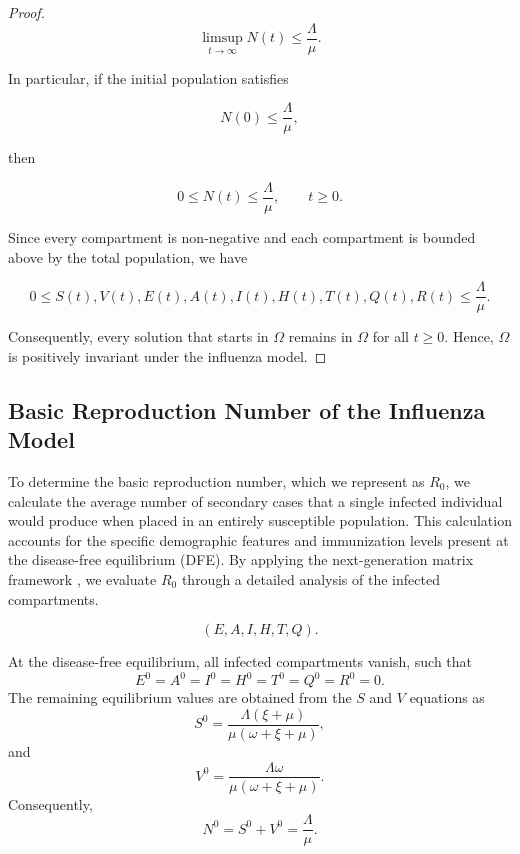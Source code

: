 \documentclass[12pt,a4paper]{article}
\theoremstyle{definition}
\theoremstyle{remark}
\begin{document}
\begin{proof}
\[
\limsup_{t\rightarrow\infty}N(t)
\leq
\frac{\Lambda}{\mu}.
\]

In particular, if the initial population satisfies

\[
N(0)\leq\frac{\Lambda}{\mu},
\]

then

\[
0\leq N(t)\leq\frac{\Lambda}{\mu},
\qquad t\geq0.
\]

Since every compartment is non-negative and each compartment is bounded
above by the total population, we have

\[
0\leq S(t),V(t),E(t),A(t),I(t),H(t),T(t),Q(t),R(t)
\leq\frac{\Lambda}{\mu}.
\]

Consequently, every solution that starts in $\Omega$ remains in $\Omega$
for all $t\geq0$. Hence, $\Omega$ is positively invariant under the
influenza model.

\end{proof}


\subsection{Basic Reproduction Number of the Influenza Model}

To determine the basic reproduction number, which we represent as $R_0$, we calculate the average number of secondary cases that a single infected individual would produce when placed in an entirely susceptible population. This calculation accounts for the specific demographic features and immunization levels present at the disease-free equilibrium (DFE). By applying the next-generation matrix framework \cite{vandenDriessche2002}, we evaluate $R_0$ through a detailed analysis of the infected compartments.


\[
(E,A,I,H,T,Q).
\]

At the disease-free equilibrium, all infected compartments vanish, such that
\[
E^0=A^0=I^0=H^0=T^0=Q^0=R^0=0.
\]
The remaining equilibrium values are obtained from the $S$ and $V$ equations as
\begin{equation}
S^0=
\frac{\Lambda(\xi+\mu)}
{\mu(\omega+\xi+\mu)},
\end{equation}
and
\begin{equation}
V^0=
\frac{\Lambda\omega}
{\mu(\omega+\xi+\mu)}.
\end{equation}
Consequently,
\begin{equation}
N^0=S^0+V^0=\frac{\Lambda}{\mu}.
\end{equation}
\end{document}
